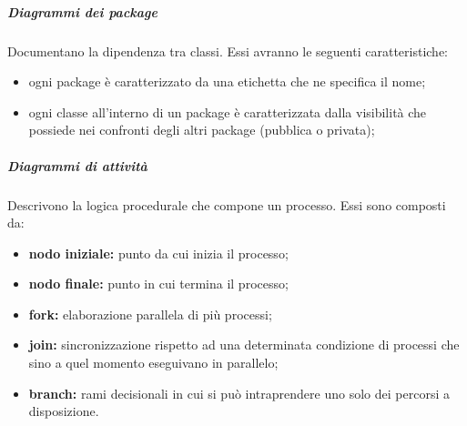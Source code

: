 \subparagraph*{Diagrammi dei package} Documentano la dipendenza tra classi. Essi avranno le seguenti caratteristiche:
\begin{itemize}
	\item ogni package è caratterizzato da una etichetta che ne specifica il nome;
	\item ogni classe all'interno di un package è caratterizzata dalla visibilità che possiede nei confronti degli altri package (pubblica o privata);
\end{itemize}

\subparagraph*{Diagrammi di attività} Descrivono la logica procedurale che compone un processo. Essi sono composti da:
\begin{itemize}
	\item \textbf{nodo iniziale:} punto da cui inizia il processo;
	\item \textbf{nodo finale:} punto in cui termina il processo;
	\item \textbf{fork:} elaborazione parallela di più processi;
	\item \textbf{join:} sincronizzazione rispetto ad una determinata condizione di processi che sino a quel momento eseguivano in parallelo;
	\item \textbf{branch:} rami decisionali in cui si può intraprendere uno solo dei percorsi a disposizione.
\end{itemize}


